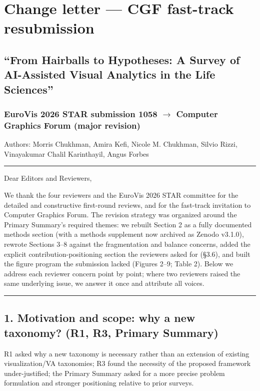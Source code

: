 \documentclass[11pt]{article}
\begin{document}
\section*{Change letter — CGF fast-track resubmission}
\subsection*{``From Hairballs to Hypotheses: A Survey of AI-Assisted Visual Analytics in the Life Sciences''}
\subsubsection*{EuroVis 2026 STAR submission 1058 $\rightarrow$ Computer Graphics Forum (major revision)}

Authors: Morris Chukhman, Amira Kefi, Nicole M. Chukhman, Silvio Rizzi, Vinayakumar Chalil Karinthayil, Angus Forbes

\bigskip\hrule\bigskip

Dear Editors and Reviewers,

We thank the four reviewers and the EuroVis 2026 STAR committee for the detailed and constructive first-round reviews, and for the fast-track invitation to Computer Graphics Forum. The revision strategy was organized around the Primary Summary's required themes: we rebuilt Section 2 as a fully documented methods section (with a methods supplement now archived as Zenodo v3.1.0), rewrote Sections 3--8 against the fragmentation and balance concerns, added the explicit contribution-positioning section the reviewers asked for (\S3.6), and built the figure program the submission lacked (Figures 2--9; Table 2). Below we address each reviewer concern point by point; where two reviewers raised the same underlying issue, we answer it once and attribute all voices.

\bigskip\hrule\bigskip

\subsection*{1. Motivation and scope: why a new taxonomy? (R1, R3, Primary Summary)}

R1 asked why a new taxonomy is necessary rather than an extension of existing visualization/VA taxonomies; R3 found the necessity of the proposed framework under-justified; the Primary Summary asked for a more precise problem formulation and stronger positioning relative to prior surveys.
\end{document}
